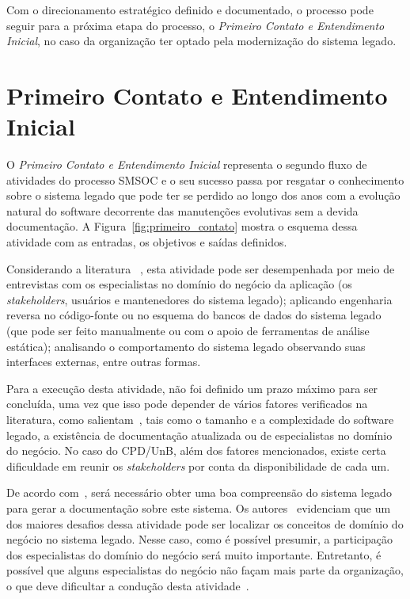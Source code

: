 Com o direcionamento estratégico definido
e documentado, o processo pode seguir para a próxima etapa 
do processo, o \emph{Primeiro Contato e Entendimento Inicial}, 
no caso da organização ter optado pela modernização do sistema legado.




\section{Primeiro Contato e Entendimento Inicial}\label{pro:prim_contato}


O \emph{Primeiro Contato e Entendimento Inicial} 
representa o segundo fluxo de atividades
do processo \acrshort{SMSOC} e o
seu sucesso passa por resgatar o
conhecimento sobre o sistema legado 
que pode ter se perdido ao longo dos anos com a 
evolução natural do software decorrente 
das manutenções evolutivas sem a devida documentação.
A Figura~\ref{fig:primeiro_contato} mostra o 
esquema dessa atividade com as entradas, 
os objetivos e saídas definidos.


Considerando a literatura
~\cite{S4_bennett1995legacy, S3_Bisbal:1999, Chikofsky:1990, Comella:2000, OORP2013},
esta atividade pode ser desempenhada 
por meio de entrevistas com os especialistas no
domínio do negócio da aplicação 
(os \textit{stakeholders}, usuários e 
mantenedores do sistema legado);
aplicando engenharia reversa
no código-fonte ou no esquema do bancos de 
dados do sistema legado (que pode ser feito manualmente ou com o apoio
de ferramentas de análise estática);
analisando o comportamento do sistema legado observando
suas interfaces externas, entre outras formas.


Para a execução desta atividade, 
não foi definido um prazo máximo 
para ser concluída,
uma vez que isso pode depender de vários fatores verificados na literatura, 
como salientam~\cite{S4_bennett1995legacy, S3_Bisbal:1999, S04_IntLgSw:2006}, 
tais como 
o tamanho e a complexidade do software legado,
a existência de documentação atualizada 
ou de especialistas no domínio do negócio. 
No caso do CPD/UnB, 
além dos fatores mencionados,
existe certa dificuldade em reunir 
os \textit{stakeholders} por conta da disponibilidade de cada um.


De acordo com~\cite{S4_bennett1995legacy, S3_Bisbal:1999}, 
será necessário obter uma boa 
compreensão do sistema legado para
gerar a documentação sobre este sistema. 
Os autores~\cite{S4_bennett1995legacy, clements2002documenting} evidenciam
que um dos maiores desafios dessa atividade pode ser 
localizar os conceitos
de domínio do negócio no sistema legado.
Nesse caso, como é possível presumir,
a participação dos especialistas do 
domínio do negócio será muito importante.
Entretanto, é possível que alguns especialistas do negócio
não façam mais parte da organização, 
o que deve dificultar a condução desta atividade~\cite{S4_bennett1995legacy}.


